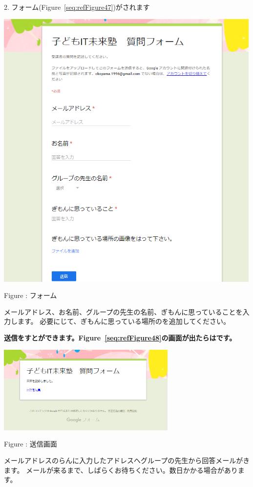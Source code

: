 \documentclass[a4paper,12pt]{jarticle}
\begin{document}
2.
フォーム(Figure~\ref{seq:refFigure47})がされます

\centering
\begin{minipage}{11.915cm}
  {\upshape
    \includegraphics[width=13.263cm,height=14.233cm]{textbook-img246.png}
    \flushleft

    \bigskip
    Figure {\theFigure\label{seq:refFigure47}}: フォーム}
\end{minipage}
\flushleft

\bigskip

メールアドレス、お名前、グループの先生の名前、ぎもんに思っていることを入力します。
必要にじて、ぎもんに思っている場所のを追加してください。

{\bfseries
送信\textmd{をすとができます。Figure~\ref{seq:refFigure48}の画面が出たらはです。}}



\centering
\begin{minipage}{8.871cm}
  {\upshape
    \includegraphics[width=8.871cm,height=4.374cm]{textbook-img247.png}
    \flushleft

    \bigskip
    Figure {\theFigure\label{seq:refFigure48}}: 送信画面}
\end{minipage}
\flushleft
メールアドレスのらんに入力したアドレスへグループの先生から回答メールがきます。
メールが来るまで、しばらくお待ちください。数日かかる場合があります。
\end{document}
